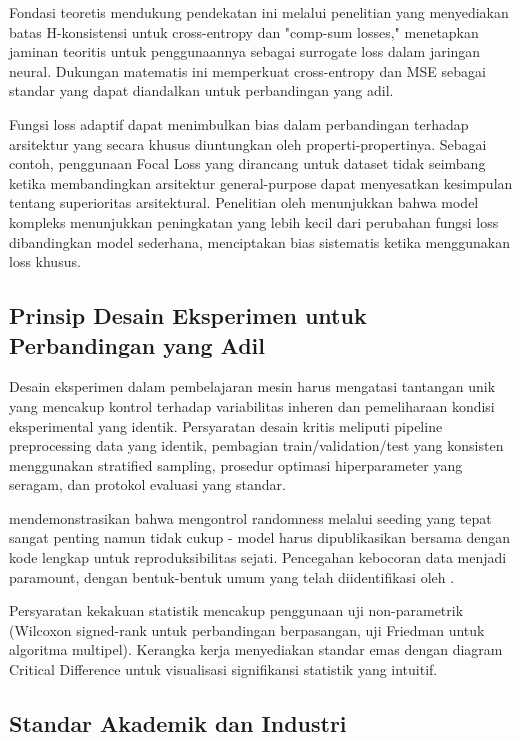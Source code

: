 \documentclass[12pt,a4paper]{article}
\begin{document}
Fondasi teoretis mendukung pendekatan ini melalui penelitian \citet{mao2023theoretical} yang menyediakan batas H-konsistensi untuk cross-entropy dan "comp-sum losses," menetapkan jaminan teoritis untuk penggunaannya sebagai surrogate loss dalam jaringan neural. Dukungan matematis ini memperkuat cross-entropy dan MSE sebagai standar yang dapat diandalkan untuk perbandingan yang adil.

Fungsi loss adaptif dapat menimbulkan bias dalam perbandingan terhadap arsitektur yang secara khusus diuntungkan oleh properti-propertinya. Sebagai contoh, penggunaan Focal Loss yang dirancang untuk dataset tidak seimbang ketika membandingkan arsitektur general-purpose dapat menyesatkan kesimpulan tentang superioritas arsitektural. Penelitian oleh \citet{wang2022comprehensive} menunjukkan bahwa model kompleks menunjukkan peningkatan yang lebih kecil dari perubahan fungsi loss dibandingkan model sederhana, menciptakan bias sistematis ketika menggunakan loss khusus.

\subsection{Prinsip Desain Eksperimen untuk Perbandingan yang Adil}

Desain eksperimen dalam pembelajaran mesin harus mengatasi tantangan unik yang mencakup kontrol terhadap variabilitas inheren dan pemeliharaan kondisi eksperimental yang identik. Persyaratan desain kritis meliputi pipeline preprocessing data yang identik, pembagian train/validation/test yang konsisten menggunakan stratified sampling, prosedur optimasi hiperparameter yang seragam, dan protokol evaluasi yang standar.

\citet{heil2021reproducibility} mendemonstrasikan bahwa mengontrol randomness melalui seeding yang tepat sangat penting namun tidak cukup - model harus dipublikasikan bersama dengan kode lengkap untuk reproduksibilitas sejati. Pencegahan kebocoran data menjadi paramount, dengan bentuk-bentuk umum yang telah diidentifikasi oleh \citet{kapoor2022leakage}.

Persyaratan kekakuan statistik mencakup penggunaan uji non-parametrik (Wilcoxon signed-rank untuk perbandingan berpasangan, uji Friedman untuk algoritma multipel). Kerangka kerja \citet{demsar2006statistical} menyediakan standar emas dengan diagram Critical Difference untuk visualisasi signifikansi statistik yang intuitif.

\subsection{Standar Akademik dan Industri}
\end{document}

